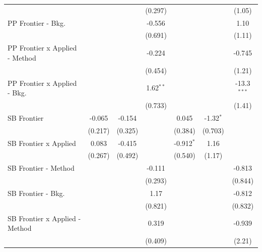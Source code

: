 \begin{tabular}{lcccccc}
                                  &         &             & (0.297)     &              &               & (1.05)\\   
   PP Frontier - Bkg.             &         &             & -0.556      &              &               & 1.10\\   
                                  &         &             & (0.691)     &              &               & (1.11)\\   
   PP Frontier x Applied - Method &         &             & -0.224      &              &               & -0.745\\   
                                  &         &             & (0.454)     &              &               & (1.21)\\   
   PP Frontier x Applied - Bkg.   &         &             & 1.62$^{**}$ &              &               & -13.3$^{***}$\\   
                                  &         &             & (0.733)     &              &               & (1.41)\\   
   SB Frontier                    & -0.065  & -0.154      &             & 0.045        & -1.32$^{*}$   &   \\   
                                  & (0.217) & (0.325)     &             & (0.384)      & (0.703)       &   \\   
   SB Frontier x Applied          & 0.083   & -0.415      &             & -0.912$^{*}$ & 1.16          &   \\   
                                  & (0.267) & (0.492)     &             & (0.540)      & (1.17)        &   \\   
   SB Frontier - Method           &         &             & -0.111      &              &               & -0.813\\   
                                  &         &             & (0.293)     &              &               & (0.844)\\   
   SB Frontier - Bkg.             &         &             & 1.17        &              &               & -0.812\\   
                                  &         &             & (0.821)     &              &               & (0.832)\\   
   SB Frontier x Applied - Method &         &             & 0.319       &              &               & -0.939\\   
                                  &         &             & (0.409)     &              &               & (2.21)\\   

\end{tabular}
